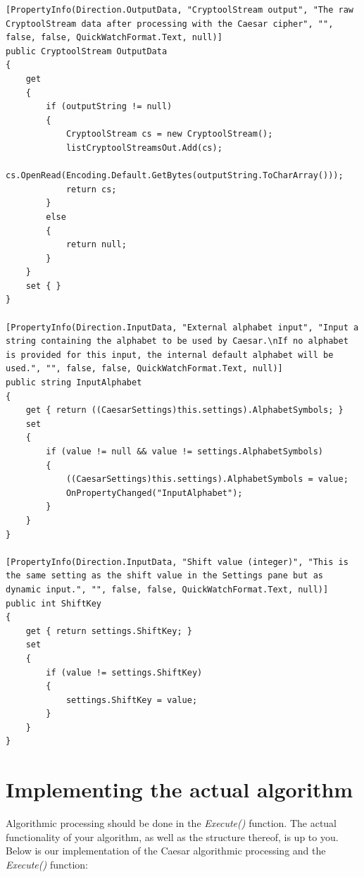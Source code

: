 \begin{lstlisting}
[PropertyInfo(Direction.OutputData, "CryptoolStream output", "The raw CryptoolStream data after processing with the Caesar cipher", "", false, false, QuickWatchFormat.Text, null)]
public CryptoolStream OutputData
{
	get
	{
		if (outputString != null)
		{
			CryptoolStream cs = new CryptoolStream();
			listCryptoolStreamsOut.Add(cs);
			cs.OpenRead(Encoding.Default.GetBytes(outputString.ToCharArray()));
			return cs;
		}
		else
		{
			return null;
		}
	}
	set { }
}

[PropertyInfo(Direction.InputData, "External alphabet input", "Input a string containing the alphabet to be used by Caesar.\nIf no alphabet is provided for this input, the internal default alphabet will be used.", "", false, false, QuickWatchFormat.Text, null)]
public string InputAlphabet
{
	get { return ((CaesarSettings)this.settings).AlphabetSymbols; }
	set
	{
		if (value != null && value != settings.AlphabetSymbols)
		{
			((CaesarSettings)this.settings).AlphabetSymbols = value;
			OnPropertyChanged("InputAlphabet");
		}
	}
}

[PropertyInfo(Direction.InputData, "Shift value (integer)", "This is the same setting as the shift value in the Settings pane but as dynamic input.", "", false, false, QuickWatchFormat.Text, null)]
public int ShiftKey
{
	get { return settings.ShiftKey; }
	set
	{
		if (value != settings.ShiftKey)
		{
			settings.ShiftKey = value;
		}
	}
}
\end{lstlisting}

\section{Implementing the actual algorithm}
\label{sec:ImplementingTheActualAlgorithm}

Algorithmic processing should be done in the \textit{Execute()} function. The actual functionality of your algorithm, as well as the structure thereof, is up to you. Below is our implementation of the Caesar algorithmic processing and the \textit{Execute()} function:

